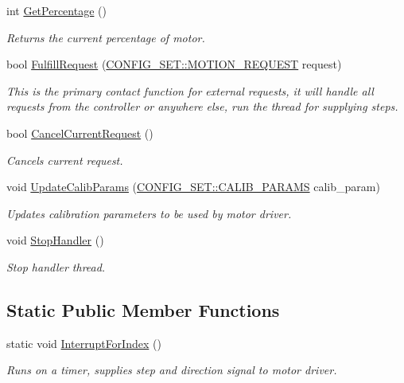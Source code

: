 \begin{DoxyCompactItemize}
int \hyperlink{classMotorDriver_a409447a5b649f11549d4c6764a304d11}{Get\+Percentage} ()
\begin{DoxyCompactList}\small\item\em Returns the current percentage of motor. \end{DoxyCompactList}\item 
bool \hyperlink{classMotorDriver_a47d4e4a6cd3eec255eee3864a45e7e76}{Fulfill\+Request} (\hyperlink{structCONFIG__SET_1_1MOTION__REQUEST}{C\+O\+N\+F\+I\+G\+\_\+\+S\+E\+T\+::\+M\+O\+T\+I\+O\+N\+\_\+\+R\+E\+Q\+U\+E\+ST} request)
\begin{DoxyCompactList}\small\item\em This is the primary contact function for external requests, it will handle all requests from the controller or anywhere else, run the thread for supplying steps. \end{DoxyCompactList}\item 
bool \hyperlink{classMotorDriver_af1a7f20e03d76a0c1dac5e2080edd832}{Cancel\+Current\+Request} ()
\begin{DoxyCompactList}\small\item\em Cancels current request. \end{DoxyCompactList}\item 
void \hyperlink{classMotorDriver_a04e97c6adc4df4d186d6799dfd8165b2}{Update\+Calib\+Params} (\hyperlink{structCONFIG__SET_1_1CALIB__PARAMS}{C\+O\+N\+F\+I\+G\+\_\+\+S\+E\+T\+::\+C\+A\+L\+I\+B\+\_\+\+P\+A\+R\+A\+MS} calib\+\_\+param)
\begin{DoxyCompactList}\small\item\em Updates calibration parameters to be used by motor driver. \end{DoxyCompactList}\item 
void \hyperlink{classMotorDriver_a43c47b4f550a3ee08e7da340e699ba76}{Stop\+Handler} ()
\begin{DoxyCompactList}\small\item\em Stop handler thread. \end{DoxyCompactList}\end{DoxyCompactItemize}
\subsection*{Static Public Member Functions}
\begin{DoxyCompactItemize}
\item 
static void \hyperlink{classMotorDriver_a74f208c889afd6ed5cf5008fbb0fdb63}{Interrupt\+For\+Index} ()
\begin{DoxyCompactList}\small\item\em Runs on a timer, supplies step and direction signal to motor driver. \end{DoxyCompactList}\end{DoxyCompactItemize}
